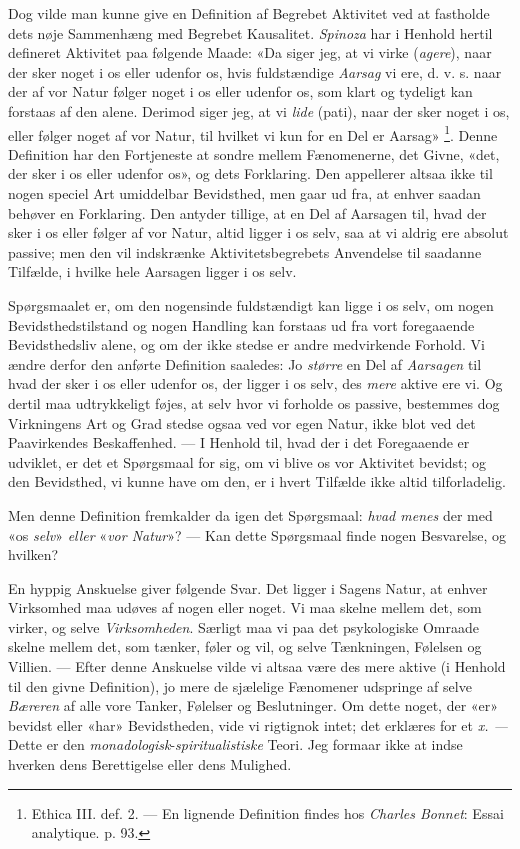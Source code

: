 \documentclass[12pt,a4paper,openany]{book}
\newcommand{\opage}[1]{\marginnote{\footnotesize\textit{[#1]}}}
\begin{document}
Dog vilde man kunne give en Definition af Begrebet Aktivitet ved at fastholde
dets nøje Sammenhæng med Begrebet Kausalitet. \emph{Spinoza} har i Henhold
hertil defineret Aktivitet paa følgende Maade: «Da siger jeg, at vi virke
(\emph{agere}), naar der sker noget i os eller udenfor os, hvis fuldstændige
\emph{Aarsag} vi ere, d. v. s. naar der af vor Natur følger noget i os eller
udenfor os, som klart og tydeligt kan forstaas af den alene. Derimod siger jeg,
at vi \emph{lide} (pati), naar der sker noget i os, eller følger noget af vor
Natur, til hvilket vi kun for en Del er Aarsag»%
\footnote[2]{Ethica III. def. 2. --- En lignende Definition findes hos
\emph{Charles Bonnet}: Essai analytique. p. 93.}. Denne Definition har den
Fortjeneste at sondre
\setcounter{footnote}{0}%
\opage{78}mellem Fænomenerne, det Givne, «det, der sker i os eller udenfor os»,
og dets Forklaring. Den appellerer altsaa ikke til nogen speciel Art umiddelbar
Bevidsthed, men gaar ud fra, at enhver saadan behøver en Forklaring. Den
antyder tillige, at en Del af Aarsagen til, hvad der sker i os eller følger af
vor Natur, altid ligger i os selv, saa at vi aldrig ere absolut passive; men
den vil indskrænke Aktivitetsbegrebets Anvendelse til saadanne Tilfælde, i
hvilke hele Aarsagen ligger i os selv.

Spørgsmaalet er, om den nogensinde fuldstændigt kan ligge i os selv, om nogen
Bevidsthedstilstand og nogen Handling kan forstaas ud fra vort foregaaende
Bevidsthedsliv alene, og om der ikke stedse er andre medvirkende Forhold. Vi
ændre derfor den anførte Definition saaledes: Jo \emph{større} en Del af
\emph{Aarsagen} til hvad der sker i os eller udenfor os, der ligger i os selv,
des \emph{mere} aktive ere vi. Og dertil maa udtrykkeligt føjes, at selv hvor
vi forholde os passive, bestemmes dog Virkningens Art og Grad stedse ogsaa ved
vor egen Natur, ikke blot ved det Paavirkendes Beskaffenhed. --- I Henhold til,
hvad der i det Foregaaende er udviklet, er det et Spørgsmaal for sig, om vi
blive os vor Aktivitet bevidst; og den Bevidsthed, vi kunne have om den, er i
hvert Tilfælde ikke altid tilforladelig.

Men denne Definition fremkalder da igen det Spørgsmaal: \emph{hvad menes} der
med «os \emph{selv}» \emph{eller} «\emph{vor Natur}»? --- Kan dette Spørgsmaal
finde nogen Besvarelse, og hvilken?

En hyppig Anskuelse giver følgende Svar. Det ligger i Sagens Natur, at enhver
Virksomhed maa udøves af nogen eller noget. Vi maa skelne mellem det, som
virker, og selve \emph{Virksomheden}. Særligt maa vi paa det psykologiske
Omraade skelne mellem det, som tænker, føler og vil, og selve Tænkningen,
Følelsen og Villien. --- Efter denne Anskuelse vilde vi altsaa være des mere
aktive (i Henhold til den givne Definition), jo mere de sjælelige Fænomener
udspringe af selve \emph{Bæreren} af alle vore Tanker, Følelser og
Beslutninger. Om dette noget, der «er» bevidst eller «har» Bevidstheden, vide
vi rigtignok intet; det erklæres for et \textit{x. ---} Dette er den
\emph{monadologisk}-\emph{spiritualistiske} Teori. Jeg formaar ikke at indse
hverken dens Berettigelse eller dens Mulighed.
\end{document}
